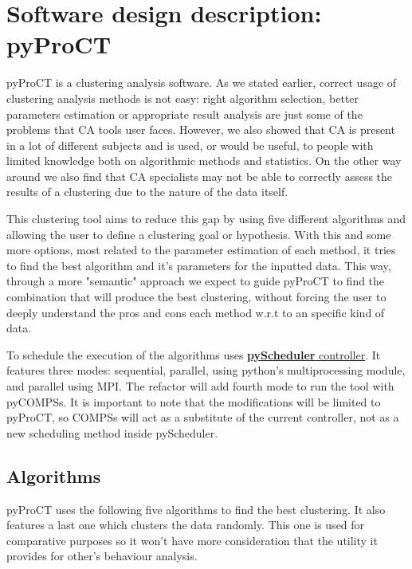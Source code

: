 \section{Software design description: pyProCT}



pyProCT is a clustering analysis software. As we stated earlier, correct usage of clustering analysis methods is not easy: right algorithm selection, better parameters estimation or appropriate result analysis are just some of the problems that CA tools user faces. However, we also showed that CA is present in a lot of different subjects and is used, or would be useful, to people with  limited knowledge both on algorithmic methods and statistics. On the other way around we also find that CA specialists may not be able to correctly assess the results of a clustering due to the nature of the data itself.

This clustering tool aims to reduce this gap by using five different algorithms and allowing the user to define a clustering goal or hypothesis. With this and some more options, most related to the parameter estimation of each method, it tries to find the best algorithm and it's parameters for the inputted data. This way, through a more "semantic" approach we expect to guide pyProCT to find the combination that will produce the best clustering, without forcing the user to deeply understand the pros and cons each method w.r.t to an specific kind of data.

To schedule the execution of the algorithms uses \hyperref[sec:docs]{\textbf{pyScheduler} controller}. It features three modes: sequential, parallel, using python's multiprocessing module, and parallel using MPI. The refactor will add fourth mode to run the tool with pyCOMPSs. It is important to note that the modifications will be limited to pyProCT, so COMPSs will act as a substitute of the current controller, not as a new scheduling method inside pyScheduler.



\subsection {Algorithms}

pyProCT uses the following five algorithms to find the best clustering. It also features a last one which clusters the data randomly. This one is used for comparative purposes so it won't have more consideration that the utility it provides for other's behaviour analysis.

